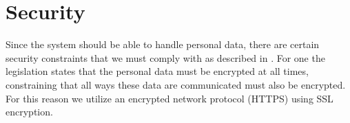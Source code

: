 \section{Security}


Since the system should be able to handle personal data, there are certain security constraints that we must comply with as described in . For one the legislation states that the personal data must be encrypted at all times, constraining that all ways these data are communicated must also be encrypted. For this reason we utilize an encrypted network protocol (HTTPS) using SSL encryption.

